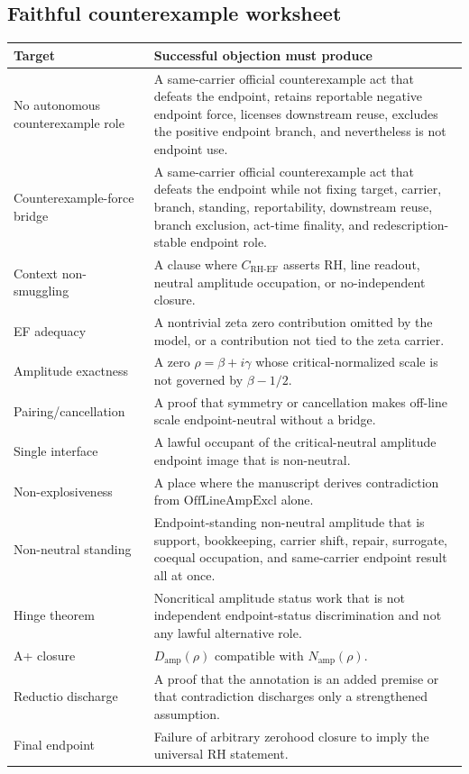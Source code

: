 \documentclass[11pt]{article}
\newcommand{\CRHEF}{C_{\mathrm{RH}\text{-}\mathrm{EF}}}
\newcommand{\OffAmpExcl}{\mathrm{OffLineAmpExcl}}
\newcommand{\Damp}{D_{\mathrm{amp}}}
\newcommand{\Namp}{N_{\mathrm{amp}}}
\begin{document}
\subsection{Faithful counterexample worksheet}

\begin{longtable}{L{0.29\textwidth}L{0.64\textwidth}}
\toprule
\textbf{Target} & \textbf{Successful objection must produce}\\
\midrule
No autonomous counterexample role & A same-carrier official counterexample act that defeats the endpoint, retains reportable negative endpoint force, licenses downstream reuse, excludes the positive endpoint branch, and nevertheless is not endpoint use.\\
Counterexample-force bridge & A same-carrier official counterexample act that defeats the endpoint while not fixing target, carrier, branch, standing, reportability, downstream reuse, branch exclusion, act-time finality, and redescription-stable endpoint role.\\
Context non-smuggling & A clause where \(\CRHEF\) asserts RH, line readout, neutral amplitude occupation, or no-independent closure.\\
EF adequacy & A nontrivial zeta zero contribution omitted by the model, or a contribution not tied to the zeta carrier.\\
Amplitude exactness & A zero \(\rho=\beta+i\gamma\) whose critical-normalized scale is not governed by \(\beta-1/2\).\\
Pairing/cancellation & A proof that symmetry or cancellation makes off-line scale endpoint-neutral without a bridge.\\
Single interface & A lawful occupant of the critical-neutral amplitude endpoint image that is non-neutral.\\
Non-explosiveness & A place where the manuscript derives contradiction from \(\OffAmpExcl\) alone.\\
Non-neutral standing & Endpoint-standing non-neutral amplitude that is support, bookkeeping, carrier shift, repair, surrogate, coequal occupation, and same-carrier endpoint result all at once.\\
Hinge theorem & Noncritical amplitude status work that is not independent endpoint-status discrimination and not any lawful alternative role.\\
A+ closure & \(\Damp(\rho)\) compatible with \(\Namp(\rho)\).\\
Reductio discharge & A proof that the annotation is an added premise or that contradiction discharges only a strengthened assumption.\\
Final endpoint & Failure of arbitrary zerohood closure to imply the universal RH statement.\\
\bottomrule
\end{longtable}
\end{document}
